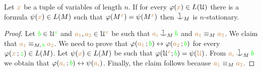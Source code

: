 \begin{proposition}\label{prop_stationarity}
Let ${\color{brown} x}$ be a tuple of variables of length $n$.
If for every $\varphi({\color{brown} x})\in L(\EuScript U)$ there is a formula $\psi({\color{brown} x})\in L(M)$ such that $\varphi(M^{\color{brown} x})=\psi(M^{\color{brown} x})$ then $\cnonfork_M$ is $n$-stationary.
\end{proposition}

\begin{proof}
Let ${\color{green} b}\in\EuScript U^{\color{green} z}$ and ${\color{brown} a_1},{\color{brown} a_2}\in\EuScript U^{\color{brown} x}$ be such that ${\mr a_i}\cnonfork_M{\gr b}$ and ${\color{brown} a_1}\equiv_M{\color{brown} a_2}$.
We claim that ${\color{brown} a_1}\equiv_{M,\,{\color{green} b}}{\color{brown} a_2}$.
We need to prove that $\varphi({\color{brown} a_1}\,;{\color{green} b})\leftrightarrow\varphi({\color{brown} a_2}\,;{\color{green} b})$ for every  $\varphi({\color{brown} x}\,;{\color{green} z})\in L(M)$.
Let $\psi({\color{brown} x})\in L(M)$ be such that $\varphi(\EuScript U^{\color{brown} x};{\color{green} b})=\psi({\color{brown} \EuScript U})$.
From ${\mr a_i}\cnonfork_M{\gr b}$ we obtain that  $\varphi({\color{brown} a_i}\,;{\color{green} b})\leftrightarrow\psi({\color{brown} a_i})$.
Finally, the claim follows because ${\color{brown} a_1}\equiv_M{\color{brown} a_2}$.
\end{proof}



% 


